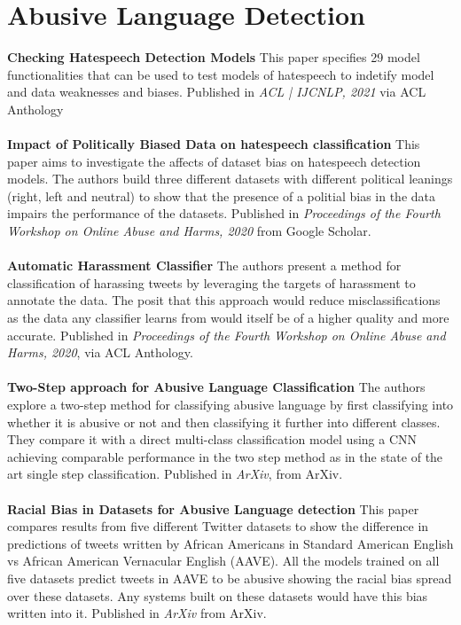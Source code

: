 \documentclass[a4]{article}
\begin{document}
\section*{Abusive Language Detection}
\textbf{Checking Hatespeech Detection Models} \cite{hatespeech} This paper specifies 29 model functionalities that can be used to test models of hatespeech to indetify model and data weaknesses and biases. Published in \textit{ACL | IJCNLP, 2021} via ACL Anthology
\\
\\
\textbf{Impact of Politically Biased Data on hatespeech classification} \cite{politicalHate} This paper aims to investigate the affects of dataset bias on hatespeech detection models. The authors build three different datasets with different political leanings (right, left and neutral) to show that the presence of a politial bias in the data impairs the performance of the datasets. Published in \textit{Proceedings of the Fourth Workshop on Online Abuse and Harms, 2020} from Google Scholar.
\\
\\
\textbf{Automatic Harassment Classifier} \cite{harassClass} The authors present a method for classification of harassing tweets by leveraging the targets of harassment to annotate the data. The posit that this approach would reduce misclassifications as the data any classifier learns from would itself be of a higher quality and more accurate. Published in \textit{Proceedings of the Fourth Workshop on Online Abuse and Harms, 2020}, via ACL Anthology.
\\
\\
\textbf{Two-Step approach for Abusive Language Classification} \cite{twoStep} The authors explore a two-step method for classifying abusive language by first classifying into whether it is abusive or not and then classifying it further into different classes. They compare it with a direct multi-class classification model using a CNN achieving comparable performance in the two step method as in the state of the art single step classification. Published in \textit{ArXiv}, from ArXiv.
\\
\\
\textbf{Racial Bias in Datasets for Abusive Language detection} \cite{raceBi} This paper compares results from five different Twitter datasets to show the difference in predictions of tweets written by African Americans in Standard American English vs African American Vernacular English (AAVE). All the models trained on all five datasets predict tweets in AAVE to be abusive showing the racial bias spread over these datasets. Any systems built on these datasets would have this bias written into it. Published in \textit{ArXiv} from ArXiv.
\end{document}

